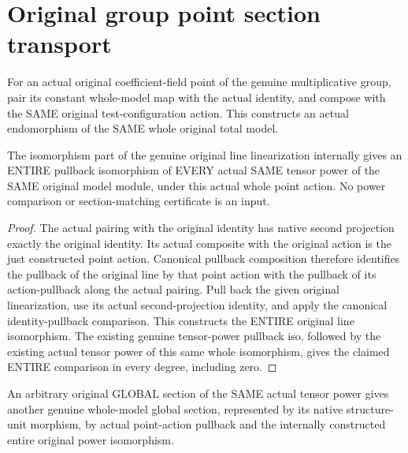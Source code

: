 \section{Original group point section transport}
\begin{definition}
\label{def:central-embedding-same-original-group-point-action}
\leanok
For an actual original coefficient-field point of the genuine multiplicative
group, pair its constant whole-model map with the actual identity, and compose
with the SAME original test-configuration action. This constructs an actual
endomorphism of the SAME whole original total model.
\end{definition}
\begin{definition}
\label{def:central-embedding-same-original-group-point-power-iso}
\leanok
The isomorphism part of the genuine original line linearization internally
gives an ENTIRE pullback isomorphism of EVERY actual SAME tensor power of the
SAME original model module, under this actual whole point action.
No power comparison or section-matching certificate is an input.
\end{definition}
\begin{proof}
The actual pairing with the original identity has native second projection
exactly the original identity. Its actual composite with the original action
is the just constructed point action. Canonical pullback composition therefore
identifies the pullback of the original line by that point action with the
pullback of its action-pullback along the actual pairing. Pull back the given
original linearization, use its actual second-projection identity, and apply
the canonical identity-pullback comparison. This constructs the ENTIRE
original line isomorphism. The existing genuine tensor-power pullback iso,
followed by the existing actual tensor power of this same whole isomorphism,
gives the claimed ENTIRE comparison in every degree, including zero.
\end{proof}
\begin{definition}
\label{def:central-embedding-actual-original-group-point-power-section}
\leanok
An arbitrary original GLOBAL section of the SAME actual tensor power gives
another genuine whole-model global section, represented by its native
structure-unit morphism, by actual point-action pullback and the internally
constructed entire original power isomorphism.
\end{definition}

